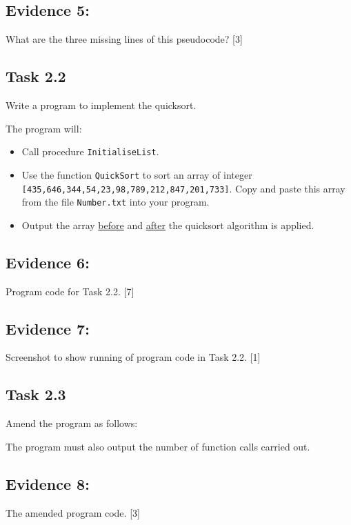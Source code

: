 \subsection*{Evidence 5: }

What are the three missing lines of this pseudocode?\hfill{} {[}3{]}

\subsection*{Task 2.2}

Write a program to implement the quicksort. 

The program will:
\begin{itemize}
\item Call procedure \texttt{InitialiseList}. 
\item Use the function \texttt{QuickSort} to sort an array of integer \texttt{{[}435,646,344,54,23,98,789,212,847,201,733{]}}.
Copy and paste this array from the file \texttt{Number.txt} into your
program. 
\item Output the array \uline{before} and \uline{after} the quicksort
algorithm is applied.
\end{itemize}

\subsection*{Evidence 6: }

Program code for Task 2.2.\hfill{} {[}7{]}

\subsection*{Evidence 7: }

Screenshot to show running of program code in Task 2.2.\hfill{} {[}1{]}

\subsection*{Task 2.3 }

Amend the program as follows: 

The program must also output the number of function calls carried
out. 

\subsection*{Evidence 8: }

The amended program code.\hfill{} {[}3{]}

